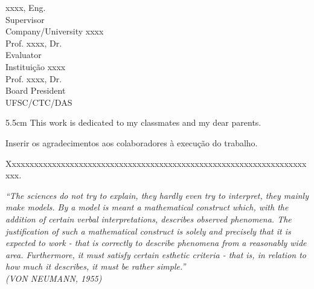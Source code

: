 \begin{folhadeaprovacao}
	\vspace*{2\baselineskip}
	xxxx, Eng.\\
	Supervisor \\
	Company/University xxxx\\
	
	\vspace*{2\baselineskip}
	Prof. xxxx, Dr.\\
	Evaluator \\
	Instituição xxxx\\
	
	\vspace*{2\baselineskip}
	Prof. xxxx, Dr.\\
	Board President \\
	UFSC/CTC/DAS
\end{folhadeaprovacao}

\begin{dedicatoria}
	\vspace*{\fill}
	\noindent
	\begin{adjustwidth*}{}{5.5cm} 
		\raggedleft       
		This work is dedicated to my classmates and my dear parents.
	\end{adjustwidth*}
\end{dedicatoria}

\begin{agradecimentos}
	Inserir os agradecimentos aos colaboradores à execução do trabalho. 
	
	Xxxxxxxxxxxxxxxxxxxxxxxxxxxxxxxxxxxxxxxxxxxxxxxxxxxxxxxxxxxxxxxxxxxxxx. 
\end{agradecimentos}

\begin{epigrafe}
	\vspace*{\fill}
	\begin{flushright}
		\textit{``The sciences do not try to explain, they hardly even try to interpret, they mainly make models. By a model is meant a mathematical construct which, with the addition of certain verbal interpretations, describes observed phenomena. The justification of such a mathematical construct is solely and precisely that it is expected to work - that is correctly to describe phenomena from a reasonably wide area. Furthermore, it must satisfy certain esthetic criteria - that is, in relation to how much it describes, it must be rather simple.''\\
			(VON NEUMANN, 1955)}%
	\end{flushright}
\end{epigrafe}

